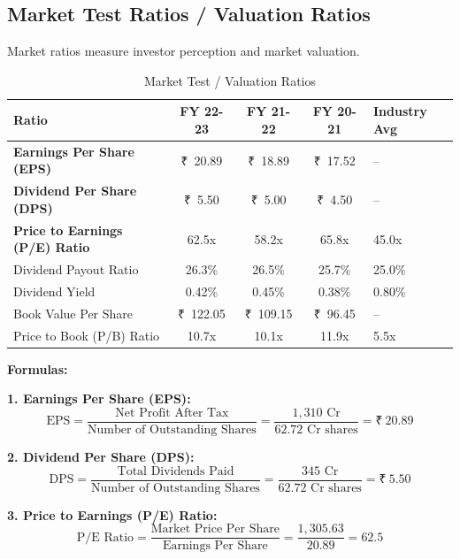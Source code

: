 \documentclass[12pt,a4paper]{article}
\newcommand{\rupee}{₹}
\begin{document}
\subsection{Market Test Ratios / Valuation Ratios}

Market ratios measure investor perception and market valuation.

\begin{table}[H]
    \centering
    \caption{Market Test / Valuation Ratios}
    \begin{tabular}{|l|c|c|c|l|}
        \hline
        \textbf{Ratio} & \textbf{FY 22-23} & \textbf{FY 21-22} & \textbf{FY 20-21} & \textbf{Industry Avg} \\
        \hline
        \textbf{Earnings Per Share (EPS)} & \rupee~20.89 & \rupee~18.89 & \rupee~17.52 & -- \\
        \hline
        \textbf{Dividend Per Share (DPS)} & \rupee~5.50 & \rupee~5.00 & \rupee~4.50 & -- \\
        \hline
        \textbf{Price to Earnings (P/E) Ratio} & 62.5x & 58.2x & 65.8x & 45.0x \\
        \hline
        Dividend Payout Ratio & 26.3\% & 26.5\% & 25.7\% & 25.0\% \\
        \hline
        Dividend Yield & 0.42\% & 0.45\% & 0.38\% & 0.80\% \\
        \hline
        Book Value Per Share & \rupee~122.05 & \rupee~109.15 & \rupee~96.45 & -- \\
        \hline
        Price to Book (P/B) Ratio & 10.7x & 10.1x & 11.9x & 5.5x \\
        \hline
    \end{tabular}
\end{table}

\textbf{Formulas:}

\textbf{1. Earnings Per Share (EPS):}
\[
\text{EPS} = \frac{\text{Net Profit After Tax}}{\text{Number of Outstanding Shares}} = \frac{1,310 \text{ Cr}}{62.72 \text{ Cr shares}} = \rupee~20.89
\]

\textbf{2. Dividend Per Share (DPS):}
\[
\text{DPS} = \frac{\text{Total Dividends Paid}}{\text{Number of Outstanding Shares}} = \frac{345 \text{ Cr}}{62.72 \text{ Cr shares}} = \rupee~5.50
\]

\textbf{3. Price to Earnings (P/E) Ratio:}
\[
\text{P/E Ratio} = \frac{\text{Market Price Per Share}}{\text{Earnings Per Share}} = \frac{1,305.63}{20.89} = 62.5
\]
\end{document}
